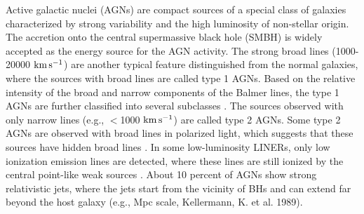 \documentclass[linenumbers]{aastex631}
\begin{document}
Active galactic nuclei (AGNs) are compact sources of a special class of galaxies characterized by strong variability and the high luminosity of non-stellar origin. The accretion onto the central supermassive black hole (SMBH) is widely accepted as the energy source for the AGN activity. The strong broad lines  (1000-20000 $ \rm{km}\, \rm{s}^{-1}$) are another typical feature distinguished from the normal galaxies, where the sources with broad lines are called type 1 AGNs. Based on the relative intensity of the broad and narrow components of the Balmer lines, the type 1 AGNs are further classified into several subclasses \citep[e.g., type 1.5, 1.8, and 1.9, see ][]{1976MNRAS.176P..61O,1981ApJ...249..462O}. The sources observed with only narrow lines (e.g., $<$1000 $ \rm{km}\, \rm{s}^{-1}$) are called type 2 AGNs. Some type 2 AGNs are observed with broad lines in polarized light, which suggests that these sources have hidden broad lines \citep[e.g.,][]{1997Natur.385..700H}. In some low-luminosity LINERs, only low ionization emission lines are detected, where these lines are still ionized by the central point-like weak sources \citep[e.g.,][]{2008ARA&A..46..475H}. About 10 percent of AGNs show strong relativistic jets, where the jets start from the vicinity of BHs and can extend far beyond the host galaxy {\color{red}(e.g., Mpc scale, Kellermann, K. et al. 1989)}. 
 


\end{document}
